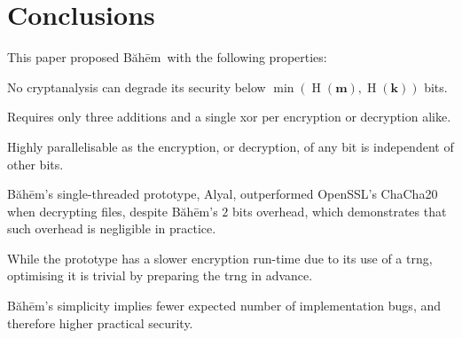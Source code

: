 \documentclass[twocolumn,hidelinks]{article}
\newcommand{\baheem}{Băhēm}
\newcommand{\alyal}{Alyal}
\DeclareMathOperator{\entropy}{H}
\begin{document}
\section{Conclusions}
This paper proposed \baheem\ with the following properties:
\begin{description}[itemsep=0em]
    \item[Secure.] No cryptanalysis can degrade its
        security below $\min(\entropy(\mathbf{m}), \entropy(\mathbf{k}))$
        bits.

    \item[Fast.] Requires only three additions and a single \gls{xor} per
        encryption or decryption alike.

        Highly parallelisable as the encryption, or decryption, of any bit
        is independent of other bits.

        \baheem's single-threaded prototype, \alyal, outperformed OpenSSL's
        ChaCha20 when decrypting files, despite \baheem's $2$ bits
        overhead, which demonstrates that such overhead is negligible in
        practice.

        While the prototype has a slower encryption run-time due to its use
        of a \gls{trng}, optimising it is trivial by preparing the
        \gls{trng} in advance.

    \item[Simple.] \baheem's simplicity implies fewer expected number of
        implementation bugs, and therefore higher practical security.
\end{description}



\end{document}

